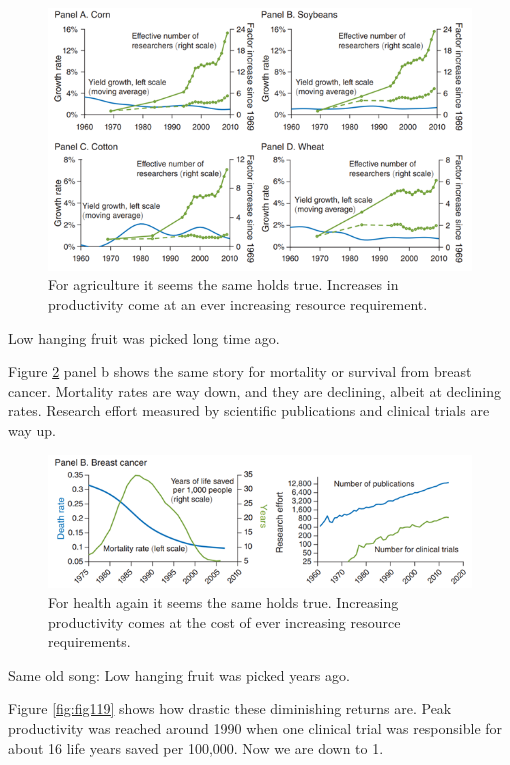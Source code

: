 \documentclass[
]{book}
\begin{document}
\begin{figure}
\includegraphics[width=1\linewidth]{img/ch1/moore17} \caption{For agriculture it seems the same holds true. Increases in productivity come at an ever increasing resource requirement.}\label{fig:fig117}
\end{figure}

Low hanging fruit was picked long time ago.

Figure \ref{fig:fig118} panel b shows the same story for mortality or survival from breast cancer. Mortality rates are way down, and they are declining, albeit at declining rates. Research effort measured by scientific publications and clinical trials are way up.

\begin{figure}
\includegraphics[width=1\linewidth]{img/ch1/moore18} \caption{For health again it seems the same holds true. Increasing productivity comes at the cost of ever increasing resource requirements.}\label{fig:fig118}
\end{figure}

Same old song: Low hanging fruit was picked years ago.

Figure \ref{fig:fig119} shows how drastic these diminishing returns are. Peak productivity was reached around 1990 when one clinical trial was responsible for about 16 life years saved per 100,000. Now we are down to 1.
\end{document}
